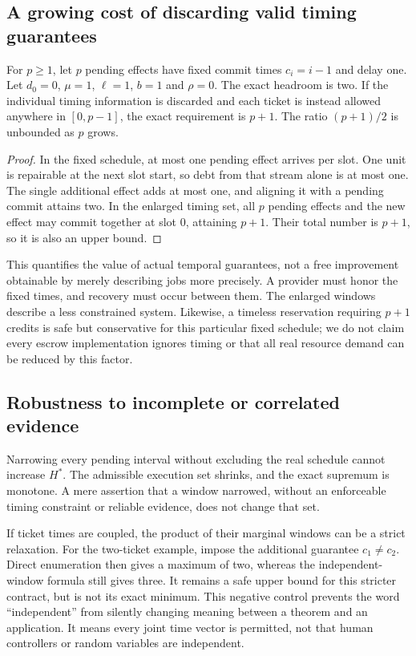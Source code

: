 \subsection{A growing cost of discarding valid timing guarantees}
\begin{proposition}
\label{prop:gap}
For $p\ge1$, let $p$ pending effects have fixed commit times $c_i=i-1$ and delay one. Let $d_0=0$, $\mu=1$, $\ell=1$, $b=1$ and $\rho=0$. The exact headroom is two. If the individual timing information is discarded and each ticket is instead allowed anywhere in $[0,p-1]$, the exact requirement is $p+1$. The ratio $(p+1)/2$ is unbounded as $p$ grows.
\end{proposition}
\begin{proof}
In the fixed schedule, at most one pending effect arrives per slot. One unit is repairable at the next slot start, so debt from that stream alone is at most one. The single additional effect adds at most one, and aligning it with a pending commit attains two. In the enlarged timing set, all $p$ pending effects and the new effect may commit together at slot 0, attaining $p+1$. Their total number is $p+1$, so it is also an upper bound.
\end{proof}
This quantifies the value of actual temporal guarantees, not a free improvement obtainable by merely describing jobs more precisely. A provider must honor the fixed times, and recovery must occur between them. The enlarged windows describe a less constrained system. Likewise, a timeless reservation requiring $p+1$ credits is safe but conservative for this particular fixed schedule; we do not claim every escrow implementation ignores timing or that all real resource demand can be reduced by this factor.

\subsection{Robustness to incomplete or correlated evidence}
Narrowing every pending interval without excluding the real schedule cannot increase $H^*$. The admissible execution set shrinks, and the exact supremum is monotone. A mere assertion that a window narrowed, without an enforceable timing constraint or reliable evidence, does not change that set.

If ticket times are coupled, the product of their marginal windows can be a strict relaxation. For the two-ticket example, impose the additional guarantee $c_1\ne c_2$. Direct enumeration then gives a maximum of two, whereas the independent-window formula still gives three. It remains a safe upper bound for this stricter contract, but is not its exact minimum. This negative control prevents the word ``independent'' from silently changing meaning between a theorem and an application. It means every joint time vector is permitted, not that human controllers or random variables are independent.

